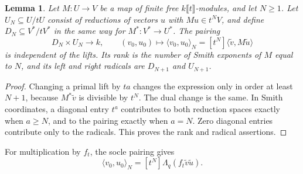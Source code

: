 \documentclass[11pt,a4paper,reqno]{amsart}
\numberwithin{equation}{section}
\theoremstyle{plain}
\newtheorem{lemma}[theorem]{Lemma}
\theoremstyle{definition}
\theoremstyle{remark}
\begin{document}
\begin{lemma}\label{lem:residual-pairing}
Let $M:U\to V$ be a map of finite free $k\llbracket t\rrbracket$-modules,
and let $N\geq1$. Let $U_N\subseteq U/tU$ consist of reductions of
vectors $u$ with $Mu\in t^NV$, and define $D_N\subseteq V^*/tV^*$
in the same way for $M^*:V^*\to U^*$.
The pairing
\[
D_N\times U_N\longrightarrow k,\qquad
(v_0,u_0)\longmapsto
\langle v_0,u_0\rangle_N=[t^N]\langle\widetilde v,M\widetilde u\rangle
\]
is independent of the lifts. Its rank is the number of Smith exponents
of $M$ equal to $N$, and its left and right radicals are
$D_{N+1}$ and $U_{N+1}$.
\end{lemma}
\begin{proof}
Changing a primal lift by $ta$ changes the expression only in order
at least $N+1$, because $M^*\widetilde v$ is divisible by $t^N$.
The dual change is the same.
In Smith coordinates, a diagonal entry $t^a$ contributes to both
reduction spaces exactly when $a\geq N$, and to the pairing exactly
when $a=N$. Zero diagonal entries contribute only to the radicals.
This proves the rank and radical assertions.
\end{proof}
For multiplication by $f_t$, the socle pairing gives
\[
\langle v_0,u_0\rangle_N
=[t^N]\Lambda_q(f_t\widetilde v\widetilde u).
\]
\end{document}
